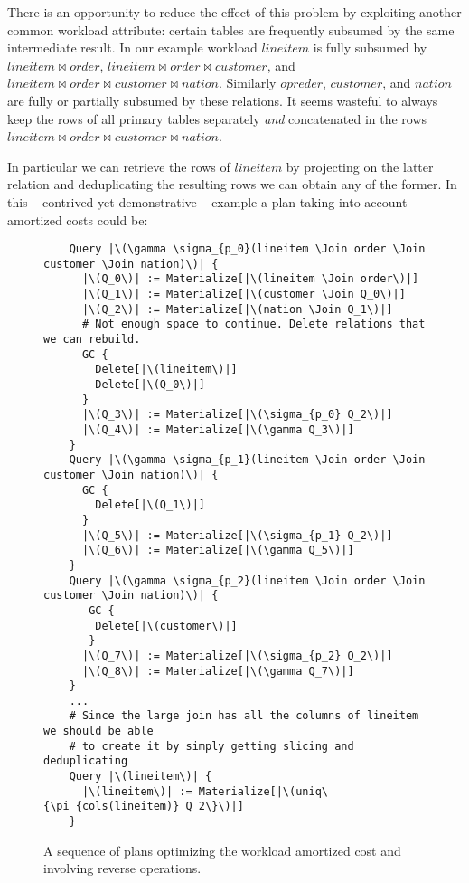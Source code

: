 There is an opportunity to reduce the effect of this problem by
exploiting another common workload attribute: certain tables are
frequently subsumed by the same intermediate result. In our example
workload \(lineitem\) is fully subsumed by \(lineitem \Join order\),
\(lineitem \Join order \Join customer\), and
\(lineitem \Join order \Join customer \Join nation\). Similarly
\(opreder\), \(customer\), and \(nation\) are fully or partially
subsumed by these relations. It seems wasteful to always keep the rows
of all primary tables separately \emph{and} concatenated in the rows
\(lineitem \Join order \Join customer \Join nation\).

In particular we can retrieve the rows of \(lineitem\) by projecting
on the latter relation and deduplicating the resulting rows we can
obtain any of the former. In this -- contrived yet demonstrative --
example a plan taking into account amortized costs could be:

\begin{figure}[H]
\begin{verbatim}
    Query |\(\gamma \sigma_{p_0}(lineitem \Join order \Join customer \Join nation)\)| {
      |\(Q_0\)| := Materialize[|\(lineitem \Join order\)|]
      |\(Q_1\)| := Materialize[|\(customer \Join Q_0\)|]
      |\(Q_2\)| := Materialize[|\(nation \Join Q_1\)|]
      # Not enough space to continue. Delete relations that we can rebuild.
      GC {
        Delete[|\(lineitem\)|]
        Delete[|\(Q_0\)|]
      }
      |\(Q_3\)| := Materialize[|\(\sigma_{p_0} Q_2\)|]
      |\(Q_4\)| := Materialize[|\(\gamma Q_3\)|]
    }
    Query |\(\gamma \sigma_{p_1}(lineitem \Join order \Join customer \Join nation)\)| {
      GC {
        Delete[|\(Q_1\)|]
      }
      |\(Q_5\)| := Materialize[|\(\sigma_{p_1} Q_2\)|]
      |\(Q_6\)| := Materialize[|\(\gamma Q_5\)|]
    }
    Query |\(\gamma \sigma_{p_2}(lineitem \Join order \Join customer \Join nation)\)| {
       GC {
        Delete[|\(customer\)|]
       }
      |\(Q_7\)| := Materialize[|\(\sigma_{p_2} Q_2\)|]
      |\(Q_8\)| := Materialize[|\(\gamma Q_7\)|]
    }
    ...
    # Since the large join has all the columns of lineitem we should be able
    # to create it by simply getting slicing and deduplicating
    Query |\(lineitem\)| {
      |\(lineitem\)| := Materialize[|\(uniq\{\pi_{cols(lineitem)} Q_2\}\)|]
    }
\end{verbatim}
  \caption{\label{fig:amortized_plan}A sequence of plans optimizing
    the workload amortized cost and involving reverse operations.}
\end{figure}

